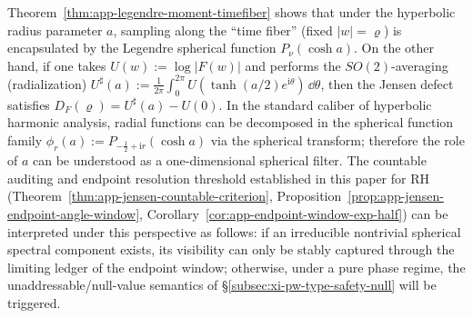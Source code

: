 \begin{remark}\label{rem:app-jensen-spherical-filter-view}
Theorem~\ref{thm:app-legendre-moment-timefiber} shows that under the hyperbolic radius parameter \(a\), sampling along the ``time fiber'' (fixed \(|w|=\varrho\)) is encapsulated by the Legendre spherical function \(P_{\nu}(\cosh a)\).
On the other hand, if one takes \(U(w):=\log|F(w)|\) and performs the \(SO(2)\)-averaging (radialization)
\(
U^{\sharp}(a):=\frac{1}{2\pi}\int_{0}^{2\pi}U(\tanh(a/2)e^{\mathrm{i}\theta})\,\dd\theta
\), then the Jensen defect satisfies \(D_F(\varrho)=U^{\sharp}(a)-U(0)\).
In the standard caliber of hyperbolic harmonic analysis, radial functions can be decomposed in the spherical function family
\(
\phi_{r}(a):=P_{-\frac12+\mathrm{i}r}(\cosh a)
\)
via the spherical transform; therefore the role of \(a\) can be understood as a one-dimensional spherical filter.
The countable auditing and endpoint resolution threshold established in this paper for RH (Theorem~\ref{thm:app-jensen-countable-criterion}, Proposition~\ref{prop:app-jensen-endpoint-angle-window}, Corollary~\ref{cor:app-endpoint-window-exp-half}) can be interpreted under this perspective as follows:
if an irreducible nontrivial spherical spectral component exists, its visibility can only be stably captured through the limiting ledger of the endpoint window; otherwise, under a pure phase regime, the unaddressable/null-value semantics of \S\ref{subsec:xi-pw-type-safety-null} will be triggered.
\end{remark}

\endinput
